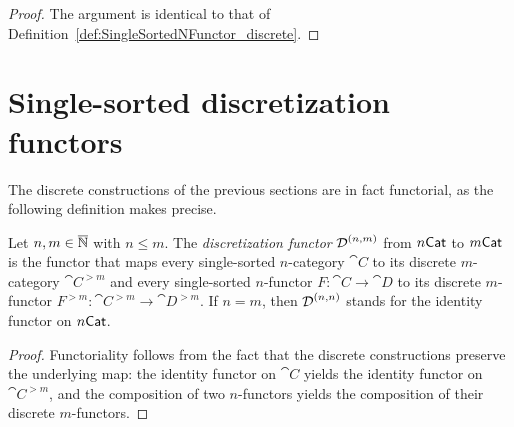 \begin{proof}
  \leanok
  The argument is identical to that of Definition~\ref{def:SingleSortedNFunctor_discrete}.
\end{proof}

\section{Single-sorted discretization functors}

The discrete constructions of the previous sections are in fact functorial, as the following
definition makes precise.

\begin{construction}
  \label{def:SingleSortedDiscretizationFunctor}
  \leanok
  Let $n, m \in \overline{\mathbb{N}}$ with $n \leq m$. The \emph{discretization functor} $\operatorname{\mathcal{D}}^{(n, m)}$ from
  $n\mathsf{Cat}$ to $m\mathsf{Cat}$ is the functor that maps every single-sorted $n$-category $\cat{C}$ to its
  discrete $m$-category $\cat{C}^{>m}$ and every single-sorted $n$-functor $F \colon \cat{C} \to
  \cat{D}$ to its discrete $m$-functor $F^{>m} \colon \cat{C}^{>m} \to \cat{D}^{>m}$. If $n = m$,
  then $\operatorname{\mathcal{D}}^{(n, n)}$ stands for the identity functor on $n\mathsf{Cat}$.
\end{construction}

\begin{proof}
  \leanok
  Functoriality follows from the fact that the discrete constructions preserve the underlying map:
  the identity functor on $\cat{C}$ yields the identity functor on $\cat{C}^{>m}$, and the
  composition of two $n$-functors yields the composition of their discrete $m$-functors.
\end{proof}

